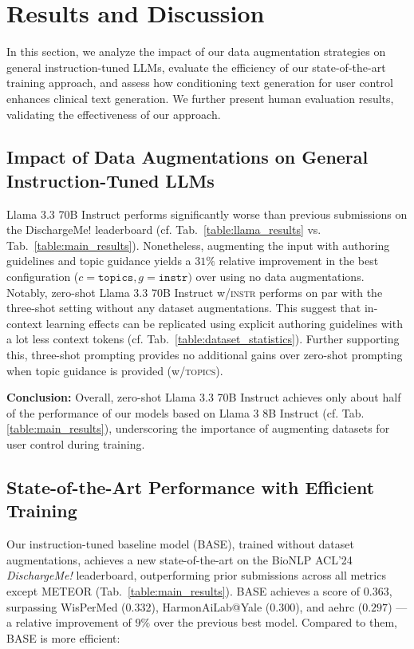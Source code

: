 \section{Results and Discussion}

In this section, we analyze the impact of our data augmentation strategies on general instruction-tuned LLMs, evaluate the efficiency of our state-of-the-art training approach, and assess how conditioning text generation for user control enhances clinical text generation. We further present human evaluation results, validating the effectiveness of our approach.

\subsection{Impact of Data Augmentations on General Instruction-Tuned LLMs} 
\label{subsec:user-control-in-general-instruction-tuned-llms}
Llama 3.3 70B Instruct performs significantly worse than previous submissions on the DischargeMe! leaderboard (cf. Tab.~\ref{table:llama_results} vs. Tab.~\ref{table:main_results}). Nonetheless, augmenting the input with authoring guidelines and topic guidance yields a $31\%$ relative improvement in the best configuration ($c = \texttt{topics}, g = \texttt{instr})$ over using no data augmentations.
Notably, zero-shot Llama 3.3 70B Instruct w/\textsc{instr} performs on par with the three-shot setting without any dataset augmentations. This suggest that in-context learning effects can be replicated using explicit authoring guidelines with a lot less context tokens (cf. Tab.~\ref{table:dataset_statistics}). Further supporting this, three-shot prompting provides no additional gains over zero-shot prompting when topic guidance is provided (w/\textsc{topics}).

\textbf{Conclusion:} Overall, zero-shot Llama 3.3 70B Instruct achieves only about half of the performance of our models based on Llama 3 8B Instruct (cf. Tab.\ref{table:main_results}), underscoring the importance of augmenting datasets for user control during training.

\subsection{State-of-the-Art Performance with Efficient Training}
Our instruction-tuned baseline model (BASE), trained without dataset augmentations, achieves a new state-of-the-art on the BioNLP ACL'24 \textit{DischargeMe!} leaderboard, outperforming prior submissions across all metrics except METEOR (Tab.~\ref{table:main_results}). BASE achieves a score of $0.363$, surpassing WisPerMed ($0.332$), HarmonAiLab@Yale ($0.300$), and aehrc ($0.297$) --- a relative improvement of $9\%$ over the previous best model. Compared to them, BASE is more efficient:

